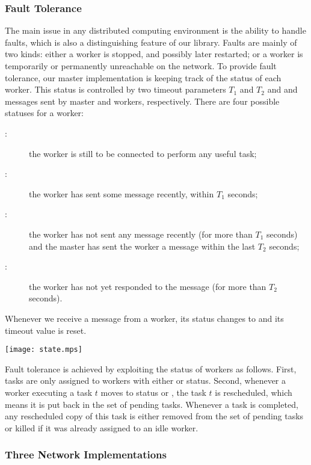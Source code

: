 \documentclass[preprint]{sigplanconf}
\begin{document}
\subsubsection{Fault Tolerance}\label{sec:fault}

The main issue in any distributed computing environment is the ability
to handle faults, which is also a distinguishing feature of our
library.  Faults are mainly of two kinds: either a worker is stopped,
and possibly later restarted; or a worker is temporarily or
permanently unreachable on the network. To provide fault tolerance,
our master implementation is keeping track of the status of each
worker.  This status is controlled by two timeout parameters $T_1$ and
$T_2$ and  and  messages sent by master and workers,
respectively. There are four possible statuses for a worker:
\begin{description}
\item[:] the worker is still to be
  connected to perform any useful task;
\item[:] the worker has sent some message recently,
  within $T_1$ seconds;
\item[:] the worker has not sent any message recently (for
  more than $T_1$ seconds) and the master has sent the worker a
   message within the last $T_2$ seconds;
\item[:] the worker has not yet responded to the 
  message (for more than $T_2$ seconds).
\end{description}
Whenever we receive a message from a worker, its status changes to
 and its timeout value is reset.
\begin{center}
  \texttt{[image: state.mps]}
\end{center}

Fault tolerance is achieved by exploiting the status of workers as
follows. First, tasks are only assigned to workers with either
 or  status. Second, whenever a worker executing
a task $t$ moves to status  or , the
task $t$ is rescheduled, which means it is put back in the set of
pending tasks. Whenever a task is completed, any rescheduled copy of
this task is either removed from the set of pending tasks or killed if
it was already assigned to an idle worker.

\subsubsection{Three Network Implementations} %
\end{document}
